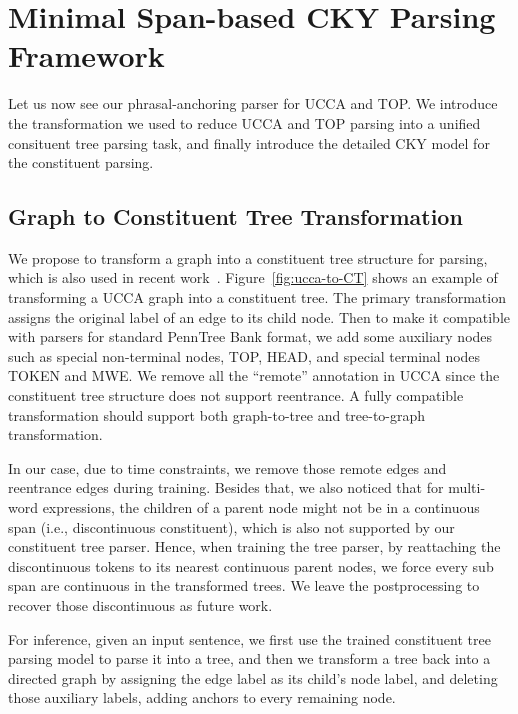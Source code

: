 \section{Minimal Span-based CKY Parsing Framework}
\label{sec:lex-phr:cky-based}

Let us now see our phrasal-anchoring parser for UCCA and TOP. We
introduce the transformation we used to reduce UCCA and TOP parsing
into a unified consituent tree parsing task, and finally introduce the
detailed CKY model for the constituent parsing.

\subsection{Graph to Constituent Tree Transformation}
\label{ssec:phr:graph-ct}

 We propose to transform a graph
into a constituent tree structure for parsing, which is also used in
recent work~\cite{jiang2019hlt}.  Figure~\ref{fig:ucca-to-CT} shows an
example of transforming a UCCA graph into a constituent tree. The
primary transformation assigns the original label of an edge to its
child node. Then to make it compatible with parsers for standard
PennTree Bank format, we add some auxiliary nodes such as special
non-terminal nodes, TOP, HEAD, and special terminal nodes TOKEN and
MWE. We remove all the ``remote'' annotation in UCCA since the
constituent tree structure does not support reentrance.  A fully
compatible transformation should support both graph-to-tree and
tree-to-graph transformation.

In our case, due to time constraints, we remove those remote edges and
reentrance edges during training. Besides that, we also noticed that
for multi-word expressions, the children of a parent node might not be
in a continuous span (i.e., discontinuous constituent), which is also
not supported by our constituent tree parser. Hence, when training the
tree parser, by reattaching the discontinuous tokens to its nearest
continuous parent nodes, we force every sub span are continuous in the
transformed trees. We leave the postprocessing to recover those
discontinuous as future work.

For inference, given an input sentence, we first use the trained
constituent tree parsing model to parse it into a tree, and then we
transform a tree back into a directed graph by assigning the edge
label as its child's node label, and deleting those auxiliary labels,
adding anchors to every remaining node.

